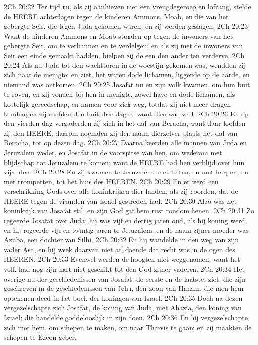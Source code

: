 2Ch 20:22  Ter tijd nu, als zij aanhieven met een vreugdegeroep en lofzang, stelde de HEERE achterlagen tegen de kinderen Ammons, Moab, en die van het gebergte Seir, die tegen Juda gekomen waren; en zij werden geslagen.
2Ch 20:23  Want de kinderen Ammons en Moab stonden op tegen de inwoners van het gebergte Seir, om te verbannen en te verdelgen; en als zij met de inwoners van Seir een einde gemaakt hadden, hielpen zij de een den ander ten verderve.
2Ch 20:24  Als nu Juda tot den wachttoren in de woestijn gekomen was, wendden zij zich naar de menigte; en ziet, het waren dode lichamen, liggende op de aarde, en niemand was ontkomen.
2Ch 20:25  Josafat nu en zijn volk kwamen, om hun buit te roven, en zij vonden bij hen in menigte, zowel have en dode lichamen, als kostelijk gereedschap, en namen voor zich weg, totdat zij niet meer dragen konden; en zij roofden den buit drie dagen, want dies was veel.
2Ch 20:26  En op den vierden dag vergaderden zij zich in het dal van Beracha, want daar loofden zij den HEERE; daarom noemden zij den naam dierzelver plaats het dal van Beracha, tot op dezen dag.
2Ch 20:27  Daarna keerden alle mannen van Juda en Jeruzalem weder, en Josafat in de voorspitse van hen, om wederom met blijdschap tot Jeruzalem te komen; want de HEERE had hen verblijd over hun vijanden.
2Ch 20:28  En zij kwamen te Jeruzalem, met luiten, en met harpen, en met trompetten, tot het huis des HEEREN.
2Ch 20:29  En er werd een verschrikking Gods over alle koninkrijken dier landen, als zij hoorden, dat de HEERE tegen de vijanden van Israel gestreden had.
2Ch 20:30  Alzo was het koninkrijk van Josafat stil; en zijn God gaf hem rust rondom henen.
2Ch 20:31  Zo regeerde Josafat over Juda; hij was vijf en dertig jaren oud, als hij koning werd, en hij regeerde vijf en twintig jaren te Jeruzalem; en de naam zijner moeder was Azuba, een dochter van Silhi.
2Ch 20:32  En hij wandelde in den weg van zijn vader Asa, en hij week daarvan niet af, doende dat recht was in de ogen des HEEREN.
2Ch 20:33  Evenwel werden de hoogten niet weggenomen; want het volk had nog zijn hart niet geschikt tot den God zijner vaderen.
2Ch 20:34  Het overige nu der geschiedenissen van Josafat, de eerste en de laatste, ziet, die zijn geschreven in de geschiedenissen van Jehu, den zoon van Hanani, die men hem optekenen deed in het boek der koningen van Israel.
2Ch 20:35  Doch na dezen vergezelschapte zich Josafat, de koning van Juda, met Ahazia, den koning van Israel; die handelde goddelooslijk in zijn doen.
2Ch 20:36  En hij vergezelschapte zich met hem, om schepen te maken, om naar Tharsis te gaan; en zij maakten de schepen te Ezeon-geber.
